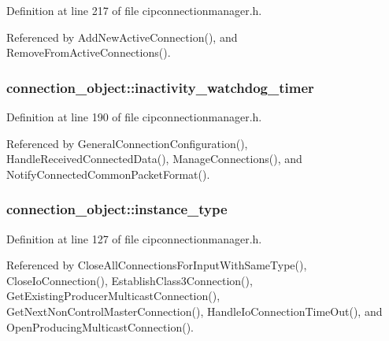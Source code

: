 \-Definition at line 217 of file cipconnectionmanager.\-h.



\-Referenced by \-Add\-New\-Active\-Connection(), and \-Remove\-From\-Active\-Connections().

\hypertarget{structconnection__object_a1e067932a0af6b123f37c7e340f1b6df}{
\subsubsection[{inactivity\-\_\-watchdog\-\_\-timer}]{ {\bf connection\-\_\-object\-::inactivity\-\_\-watchdog\-\_\-timer}}}\label{d1/d48/structconnection__object_a1e067932a0af6b123f37c7e340f1b6df}


\-Definition at line 190 of file cipconnectionmanager.\-h.



\-Referenced by \-General\-Connection\-Configuration(), \-Handle\-Received\-Connected\-Data(), \-Manage\-Connections(), and \-Notify\-Connected\-Common\-Packet\-Format().

\hypertarget{structconnection__object_ada63f5853b16b3fa0d3c49b894157540}{
\subsubsection[{instance\-\_\-type}]{ {\bf connection\-\_\-object\-::instance\-\_\-type}}}\label{d1/d48/structconnection__object_ada63f5853b16b3fa0d3c49b894157540}


\-Definition at line 127 of file cipconnectionmanager.\-h.



\-Referenced by \-Close\-All\-Connections\-For\-Input\-With\-Same\-Type(), \-Close\-Io\-Connection(), \-Establish\-Class3\-Connection(), \-Get\-Existing\-Producer\-Multicast\-Connection(), \-Get\-Next\-Non\-Control\-Master\-Connection(), \-Handle\-Io\-Connection\-Time\-Out(), and \-Open\-Producing\-Multicast\-Connection().


